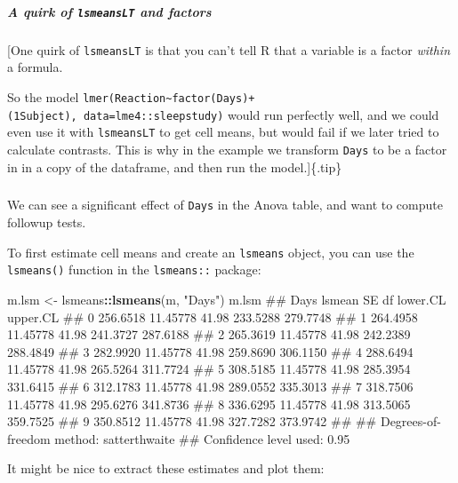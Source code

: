 \documentclass[]{article}
\newenvironment{Shaded}{\begin{snugshade}}{\end{snugshade}}
\newcommand{\KeywordTok}[1]{\textcolor[rgb]{0.13,0.29,0.53}{\textbf{#1}}}
\newcommand{\StringTok}[1]{\textcolor[rgb]{0.31,0.60,0.02}{#1}}
\newcommand{\OperatorTok}[1]{\textcolor[rgb]{0.81,0.36,0.00}{\textbf{#1}}}
\newcommand{\NormalTok}[1]{#1}
\let\oldsubparagraph\subparagraph
\renewcommand{\subparagraph}[1]{\oldsubparagraph{#1}\mbox{}}
\theoremstyle{definition}
\theoremstyle{definition}
\theoremstyle{definition}
\theoremstyle{remark}
\begin{document}
\subparagraph{\texorpdfstring{A quirk of \texttt{lsmeansLT} and
factors}{A quirk of lsmeansLT and factors}}\label{a-quirk-of-lsmeanslt-and-factors}

{[}One quirk of \texttt{lsmeansLT} is that you can't tell R that a
variable is a factor \emph{within} a formula.

So the model
\texttt{lmer(Reaction\textasciitilde{}factor(Days)+(1\textbar{}Subject),\ data=lme4::sleepstudy)}
would run perfectly well, and we could even use it with
\texttt{lsmeansLT} to get cell means, but would fail if we later tried
to calculate contrasts. This is why in the example we transform
\texttt{Days} to be a factor in in a copy of the dataframe, and then run
the model.{]}\{.tip\}

\subparagraph{}\label{section-19}

We can see a significant effect of \texttt{Days} in the Anova table, and
want to compute followup tests.

To first estimate cell means and create an \texttt{lsmeans} object, you
can use the \texttt{lsmeans()} function in the \texttt{lsmeans::}
package:

\begin{Shaded}
\begin{Highlighting}[]
\NormalTok{m.lsm <-}\StringTok{ }\NormalTok{lsmeans}\OperatorTok{::}\KeywordTok{lsmeans}\NormalTok{(m, }\StringTok{"Days"}\NormalTok{)}
\NormalTok{m.lsm}
\NormalTok{##  Days   lsmean       SE    df lower.CL upper.CL}
\NormalTok{##  0    256.6518 11.45778 41.98 233.5288 279.7748}
\NormalTok{##  1    264.4958 11.45778 41.98 241.3727 287.6188}
\NormalTok{##  2    265.3619 11.45778 41.98 242.2389 288.4849}
\NormalTok{##  3    282.9920 11.45778 41.98 259.8690 306.1150}
\NormalTok{##  4    288.6494 11.45778 41.98 265.5264 311.7724}
\NormalTok{##  5    308.5185 11.45778 41.98 285.3954 331.6415}
\NormalTok{##  6    312.1783 11.45778 41.98 289.0552 335.3013}
\NormalTok{##  7    318.7506 11.45778 41.98 295.6276 341.8736}
\NormalTok{##  8    336.6295 11.45778 41.98 313.5065 359.7525}
\NormalTok{##  9    350.8512 11.45778 41.98 327.7282 373.9742}
\NormalTok{## }
\NormalTok{## Degrees-of-freedom method: satterthwaite }
\NormalTok{## Confidence level used: 0.95}
\end{Highlighting}
\end{Shaded}

It might be nice to extract these estimates and plot them:
\end{document}

